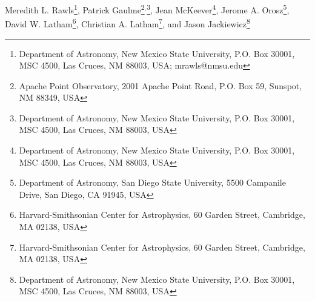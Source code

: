 
Meredith L. Rawls\footnote{Department of Astronomy, New Mexico State University, P.O. Box 30001, MSC 4500, Las Cruces, NM 88003, USA; mrawls@nmsu.edu},
\setcounter{footnote}{1}
Patrick Gaulme\footnote{Apache Point Observatory, 2001 Apache Point Road, P.O. Box 59, Sunspot, NM 88349, USA}\setcounter{footnote}{0}$^{,}$\footnote{Department of Astronomy, New Mexico State University, P.O. Box 30001, MSC 4500, Las Cruces, NM 88003, USA},
\setcounter{footnote}{0}
Jean McKeever\footnote{Department of Astronomy, New Mexico State University, P.O. Box 30001, MSC 4500, Las Cruces, NM 88003, USA},
\setcounter{footnote}{2}
Jerome A. Orosz\footnote{Department of Astronomy, San Diego State University, 5500 Campanile Drive, San Diego, CA 91945, USA},
David W. Latham\footnote{Harvard-Smithsonian Center for Astrophysics, 60 Garden Street, Cambridge, MA 02138, USA},
\setcounter{footnote}{3}
Christian A. Latham\footnote{Harvard-Smithsonian Center for Astrophysics, 60 Garden Street, Cambridge, MA 02138, USA}, and 
\setcounter{footnote}{0}
Jason Jackiewicz\footnote{Department of Astronomy, New Mexico State University, P.O. Box 30001, MSC 4500, Las Cruces, NM 88003, USA}

  